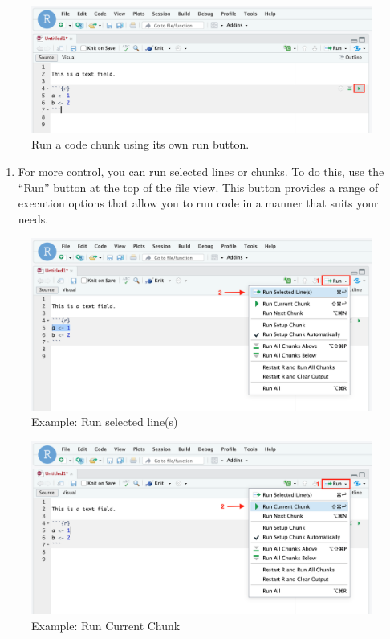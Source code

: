 \documentclass[
]{book}
\providecommand{\tightlist}{%
  \setlength{\itemsep}{0pt}\setlength{\parskip}{0pt}}
\begin{document}
\begin{figure}
\centering
\includegraphics{images/run_code_1.png}
\caption{Run a code chunk using its own run button.}
\end{figure}

\begin{enumerate}
\def\labelenumi{\arabic{enumi}.}
\setcounter{enumi}{1}
\tightlist
\item
  For more control, you can run selected lines or chunks. To do this, use the ``Run'' button at the top of the file view. This button provides a range of execution options that allow you to run code in a manner that suits your needs.
\end{enumerate}

\begin{figure}
\centering
\includegraphics{images/run_code_2.png}
\caption{Example: Run selected line(s)}
\end{figure}

\begin{figure}
\centering
\includegraphics{images/run_code_3.png}
\caption{Example: Run Current Chunk}
\end{figure}
\end{document}

